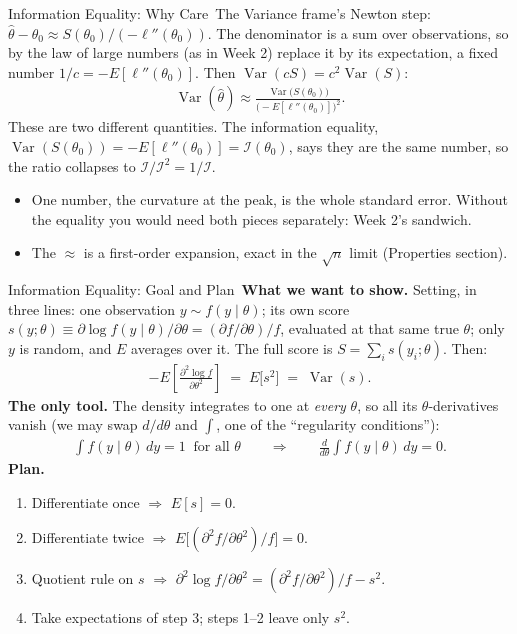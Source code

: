 \documentclass[aspectratio=169,11pt,xcolor=dvipsnames]{beamer}
\DeclareMathOperator{\Var}{Var}
\newcommand{\E}{E}
\newcommand{\loglik}{\ell}
\newcommand{\Info}{\mathcal{I}}
\newcommand{\adv}{\,\raisebox{0.6pt}{\textcolor{accent}{$\bigstar$}}}
\begin{document}
\begin{frame}{Information Equality: Why Care\adv}
The Variance frame's Newton step:
$\hat\theta - \theta_0 \approx S(\theta_0)/(-\loglik''(\theta_0))$. The
denominator is a sum over observations, so by the law of large numbers (as
in Week 2) replace it by its expectation, a fixed number
$1/c = -\E[\loglik''(\theta_0)]$. Then $\Var(cS) = c^2\Var(S)$:
\begin{align*}
  \Var(\hat\theta) \approx
  \frac{\Var\big(S(\theta_0)\big)}{\big(-\E[\loglik''(\theta_0)]\big)^{2}} .
\end{align*}
These are two different quantities. The information equality,
$\Var(S(\theta_0)) = -\E[\loglik''(\theta_0)] = \Info(\theta_0)$, says they
are the same number, so the ratio collapses to $\Info/\Info^2 = 1/\Info$.
\vskip2pt
\begin{itemize}\itemsep2pt
  \item One number, the curvature at the peak, is the whole standard error.
        Without the equality you would need both pieces separately: Week
        2's sandwich.
  \item The $\approx$ is a first-order expansion, exact in the $\sqrt n$
        limit (Properties section).
\end{itemize}
\end{frame}

\begin{frame}{Information Equality: Goal and Plan\adv}
\textbf{What we want to show.} Setting, in three lines: one observation
$y \sim f(y\mid\theta)$; its own score $s(y;\theta) \equiv
\partial\log f(y\mid\theta)/\partial\theta = (\partial f/\partial\theta)/f$,
evaluated at that same true $\theta$; only $y$ is random, and $\E$ averages
over it. The full score is $S = \sum_i s(y_i;\theta)$. Then:
\begingroup
\setlength{\abovedisplayskip}{3pt}\setlength{\belowdisplayskip}{3pt}
\begin{align*}
  -\E\!\left[\frac{\partial^2 \log f}{\partial\theta^2}\right]
  \;=\; \E\big[s^2\big] \;=\; \Var(s) .
\end{align*}
\endgroup
\textbf{The only tool.} The density integrates to one at \emph{every}
$\theta$, so all its $\theta$-derivatives vanish (we may swap $d/d\theta$
and $\int$, one of the ``regularity conditions''):
\begin{align*}
  \int f(y\mid\theta)\,dy = 1 \ \text{ for all }\theta
  \qquad\Longrightarrow\qquad
  \frac{d}{d\theta}\int f(y\mid\theta)\,dy = 0 .
\end{align*}
\textbf{Plan.}
\vskip-2pt
\begin{enumerate}\itemsep0pt
  \item Differentiate once $\Rightarrow$ $\E[s] = 0$.
  \item Differentiate twice $\Rightarrow$ $\E\big[(\partial^2 f/\partial\theta^2)/f\big] = 0$.
  \item Quotient rule on $s$ $\Rightarrow$ $\partial^2\log f/\partial\theta^2 = (\partial^2 f/\partial\theta^2)/f - s^2$.
  \item Take expectations of step 3; steps 1--2 leave only $s^2$.
\end{enumerate}
\end{frame}
\end{document}

